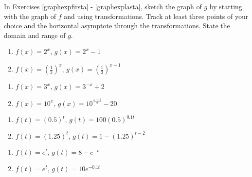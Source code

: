 \documentclass{ximera}
\begin{document}
	\author{Stitz-Zeager}


\label{ExercisesforExponentialFunctions}



In Exercises \ref{graphexpfirsta} - \ref{graphexplasta}, sketch the graph of $g$ by starting with the graph of $f$ and using transformations.  Track at least three points of your choice and the horizontal asymptote through the transformations. State the domain and range of $g$.

\begin{multicols}{2}
\begin{enumerate}

\item  $f(x) = 2^{x}$, $g(x) = 2^{x} - 1$ \label{graphexpfirsta}

\item  $f(x) = \left(\frac{1}{3}\right)^{x}$, $g(x) = \left(\frac{1}{3}\right)^{x-1}$

\setcounter{HW}{\value{enumi}}
\end{enumerate}
\end{multicols}

\begin{multicols}{2}
\begin{enumerate}
\setcounter{enumi}{\value{HW}}

\item  $f(x) = 3^{x}$, $g(x) = 3^{-x}+2$

\item  $f(x) = 10^{x}$, $g(x) = 10^{\frac{x+1}{2}} - 20$  

\setcounter{HW}{\value{enumi}}
\end{enumerate}
\end{multicols}

\begin{multicols}{2}
\begin{enumerate}
\setcounter{enumi}{\value{HW}}

\item  $f(t) = (0.5)^{t}$, $g(t) = 100(0.5)^{0.1t}$

\item  $f(t) = (1.25)^{t}$, $g(t) = 1 - (1.25)^{t-2}$

\setcounter{HW}{\value{enumi}}
\end{enumerate}
\end{multicols}

\begin{multicols}{2}
\begin{enumerate}
\setcounter{enumi}{\value{HW}}

\item  $f(t) = e^{t}$, $g(t) = 8 - e^{-t}$

\item  $f(t) = e^{t}$, $g(t) = 10e^{-0.1t}$ \label{graphexplasta}

\setcounter{HW}{\value{enumi}}
\end{enumerate}
\end{multicols}
\end{document}
